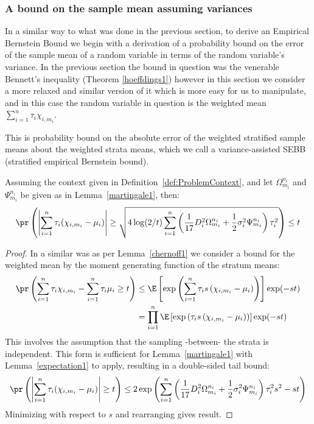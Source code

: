 \subsubsection{A bound on the sample mean assuming variances}\label{subsubsection:variance_assisted_sebb}

In a similar way to what was done in the previous section, to derive an Empirical Bernstein Bound we begin with a derivation of a probability bound on the error of the sample mean of a random variable in terms of the random variable's variance.
In the previous section the bound in question was the venerable Bennett's inequality (Theorem \ref{hoeffdings1}) however in this section we consider a more relaxed and similar version of it which is more easy for us to manipulate, and in this case the random variable in question is the weighted mean $\sum_{i=1}^n\tau_i\chi_{i,m_i}$.

This is probability bound on the absolute error of the weighted stratified sample means about the weighted strata means, which we call a variance-assisted SEBB (stratified empirical Bernstein bound).


\begin{theorem}\label{thm:1}
Assuming the context given in Definition~\ref{def:ProblemContext}, and let $\Omega_{m_i}^{n_i}$ and $\Psi_{m_i}^{n_i}$ be given as in Lemma~\ref{martingale1}, then:
\begin{equation}\label{eq1} \pr\left(\left|\sum_{i=1}^n\tau_i(\chi_{i,m_i}-\mu_i)\right|\ge \sqrt{4\log(2/t)\sum_{i=1}^n\left(\frac{1}{17}D_i^2\Omega_{m_i}^{n_i}+\frac{1}{2}\sigma_i^2\Psi_{m_i}^{n_i}\right)\tau_i^2}\right)\le t \end{equation}
\end{theorem}
\begin{proof}
In a similar was as per Lemma~\ref{chernoff1} we consider a bound for the weighted mean by the moment generating function of the stratum means:
\begin{align*} \pr\left(\sum_{i=1}^n\tau_i\chi_{i,m_i}-\sum_{i=1}^n\tau_i\mu_i\ge t\right)
&\le\E\left[\exp\left(\sum_{i=1}^n\tau_is\left(\chi_{i,m_i}-\mu_i\right)\right)\right]\exp(-st)\\
&= \prod_{i=1}^n\E\left[\exp\left(\tau_is\left(\chi_{i,m_i}-\mu_i\right)\right)\right]\exp(-st) 
\end{align*}
This involves the assumption that the sampling -between- the strata is independent.
This form is sufficient for Lemma~\ref{martingale1} with Lemma~\ref{expectation1} to apply, resulting in a double-sided tail bound:
$$ \pr\left(\left|\sum_{i=1}^n\tau_i(\chi_{i,m_i}-\mu_i)\right|\ge t\right)\le 2\exp\left(\sum_{i=1}^n\left(\frac{1}{17}D_i^2\Omega_{m_i}^{n_i}+\frac{1}{2}\sigma_i^2\Psi_{m_i}^{n_i}\right)\tau_i^2s^2 - st\right) $$
Minimizing with respect to $s$ and rearranging gives result.
\end{proof}

